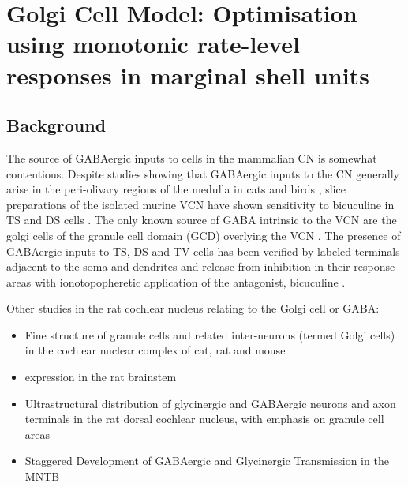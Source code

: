 

\graphicspath{{../figures/}{./gfx/}{/media/data/Work/cnstellate/golgi/}{/media/data/Work/Responses/}{/media/data/Work/cnstellate/Responses/}}

\section[Golgi Cell Model]{Golgi Cell Model: Optimisation using
  monotonic rate-level responses in marginal shell units}
\label{sec:GolgiCellModel}

\subsection{Background}

The source of GABAergic inputs to cells in the mammalian CN is
somewhat contentious. Despite studies showing that GABAergic inputs to
the CN generally arise in the peri-olivary regions of the medulla in
cats \citep{OstapoffBensonEtAl:1997} and birds
\citep{LachicaRubsamenEtAl:1995,YangMonsivaisEtAl:1999}, slice
preparations of the isolated murine VCN have shown sensitivity to
bicuculine in TS and DS cells \citep{FerragamoGoldingEtAl:1998a}.  The
only known source of GABA intrinsic to the VCN are the golgi cells of
the granule cell domain (GCD) overlying the VCN
\citep[Fig.~\ref{fig:CNdiagram}]{Mugnaini:1985,FerragamoGoldingEtAl:1998}.
The presence of GABAergic inputs to TS, DS and TV cells has been
verified by labeled terminals adjacent to the soma and dendrites
\citep{SmithRhode:1989,AwatramaniTurecekEtAl:2005,BabalianRyugoEtAl:2003}
and release from inhibition in their response areas with
ionotopopheretic application of the \GABAa antagonist, bicuculine
\citep{EvansZhao:1998,CasparyBackoffEtAl:1994,BackoffShadduckEtAl:1999,FerragamoGoldingEtAl:1998a}.

\medskip{}

Other studies in the rat cochlear nucleus relating to the Golgi cell or GABA:
\begin{itemize}
\item \citep{MugnainiOsenEtAl:1980} Fine structure of granule cells
  and related inter-neurons (termed {Golgi} cells) in the cochlear
  nuclear complex of cat, rat and mouse
\item \GABAa expression in the rat brainstem  \citep{CamposCaboEtAl:2001}
\item \citep{Alibardi:2003a} Ultrastructural distribution of
  glycinergic and {{GABAergic}} neurons and axon terminals in the rat
  dorsal cochlear nucleus, with emphasis on granule cell areas
\item \citep{AwatramaniTurecekEtAl:2005} Staggered {Development} of
  {GABAergic} and {Glycinergic} {Transmission} in the {MNTB}
\end{itemize}

